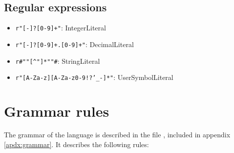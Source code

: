 \documentclass[11pt]{scrreprt}
\begin{document}
\subsection{Regular expressions}
\begin{itemize}
  \item \texttt{r"[-]?[0-9]+"}: IntegerLiteral
  \item \texttt{r"[-]?[0-9]+.[0-9]+"}: DecimalLiteral
  \item \texttt{r\#""[\^{}"]*""\#}: StringLiteral
  \item \texttt{r"[A-Za-z][A-Za-z0-9!?'\_-]*"}: UserSymbolLiteral
\end{itemize}

\section{Grammar rules}
The grammar of the language is described in the file , included in appendix \ref{apdx:grammar}. It describes the following rules:
\end{document}
